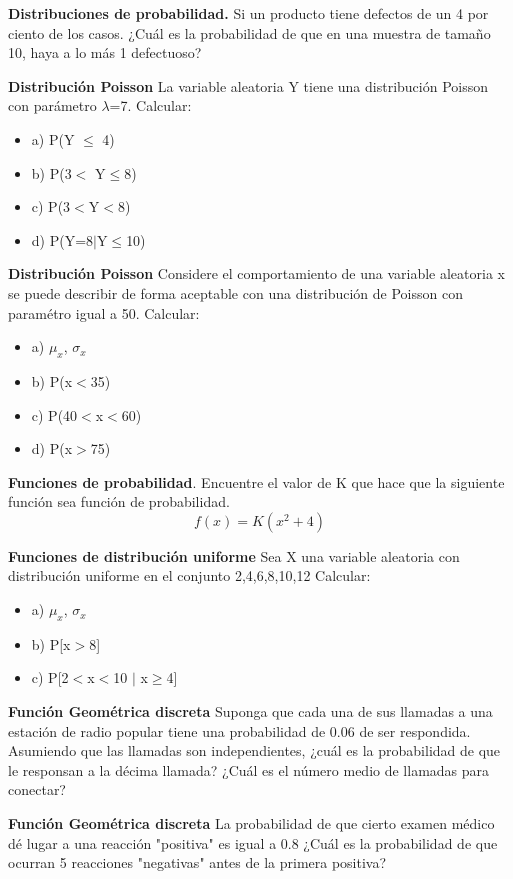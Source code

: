 \documentclass{../oxmathproblems}
\begin{document}
\begin{questions}


\miquestion \textbf {Distribuciones de probabilidad.} Si un producto tiene defectos de un 4 por ciento de los casos. ¿Cuál es la probabilidad de que en una muestra de tamaño 10, haya a lo más 1 defectuoso?

\miquestion \textbf {Distribución Poisson} La variable aleatoria Y tiene una distribución Poisson con parámetro $\lambda$=7. 
Calcular: 
\begin{itemize}
\item  a) P(Y $\leq$ 4)
\item  b) P(3$<$ Y$\leq$8)
\item  c) P(3$<$Y$<$8)
\item  d) P(Y=8$\mid$Y$\leq$10)
\end{itemize}

\miquestion \textbf {Distribución Poisson} Considere el comportamiento de una variable aleatoria x se puede describir de forma aceptable con una distribución de Poisson con paramétro igual a 50. 
Calcular: 
\begin{itemize}
\item a) $\mu_x$, $\sigma_x$
\item  b) P(x$<$35)
\item  c) P(40$<$x$<$60)
\item  d) P(x$>$75)
\end{itemize}

\miquestion \textbf{Funciones de probabilidad}.  Encuentre el valor de K que hace que la siguiente función sea función de probabilidad. 
 $$f(x) = K(x^2 + 4)$$

	
\miquestion \textbf{Funciones de distribución uniforme} Sea X una variable aleatoria con distribución uniforme en el conjunto {2,4,6,8,10,12}
Calcular: 
\begin{itemize}
\item  a) $\mu_x$, $\sigma_x$
\item  b) P[x$>$8]
\item  c) P[2$<$x$<$10 $\mid$ x$\geq$4]
\end{itemize}
	
\miquestion \textbf {Función Geométrica discreta} Suponga que cada una de sus llamadas a una estación de radio popular tiene una probabilidad de 0.06 de ser respondida. Asumiendo que las  llamadas son independientes, ¿cuál es la probabilidad de que le responsan a la décima llamada? ¿Cuál es el número medio de llamadas para conectar?

\miquestion \textbf {Función Geométrica discreta} La probabilidad de que cierto examen médico dé lugar a una reacción "positiva" es igual a 0.8 ¿Cuál es la probabilidad de que ocurran 5 reacciones "negativas" antes de la primera positiva?



\end{questions}
\end{document}
